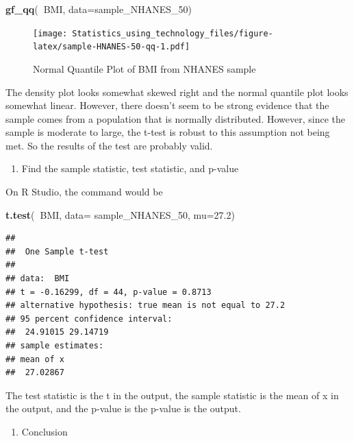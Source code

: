 \documentclass[
]{book}
\newenvironment{Shaded}{\begin{snugshade}}{\end{snugshade}}
\newcommand{\DataTypeTok}[1]{\textcolor[rgb]{0.13,0.29,0.53}{#1}}
\newcommand{\DecValTok}[1]{\textcolor[rgb]{0.00,0.00,0.81}{#1}}
\newcommand{\FloatTok}[1]{\textcolor[rgb]{0.00,0.00,0.81}{#1}}
\newcommand{\KeywordTok}[1]{\textcolor[rgb]{0.13,0.29,0.53}{\textbf{#1}}}
\newcommand{\NormalTok}[1]{#1}
\newcommand{\OperatorTok}[1]{\textcolor[rgb]{0.81,0.36,0.00}{\textbf{#1}}}
\providecommand{\tightlist}{%
  \setlength{\itemsep}{0pt}\setlength{\parskip}{0pt}}
\begin{document}
\begin{Shaded}
\begin{Highlighting}[]
\KeywordTok{gf_qq}\NormalTok{(}\OperatorTok{~}\NormalTok{BMI, }\DataTypeTok{data=}\NormalTok{sample_NHANES_}\DecValTok{50}\NormalTok{)}
\end{Highlighting}
\end{Shaded}

\begin{figure}
\centering
\texttt{[image: Statistics\_using\_technology\_files/figure-latex/sample-HNANES-50-qq-1.pdf]}
\caption{\label{fig:sample-HNANES-50-qq}Normal Quantile Plot of BMI from NHANES sample}
\end{figure}

The density plot looks somewhat skewed right and the normal quantile plot looks somewhat linear. However, there doesn't seem to be strong evidence that the sample comes from a population that is normally distributed. However, since the sample is moderate to large, the t-test is robust to this assumption not being met. So the results of the test are probably valid.

\begin{enumerate}
\def\labelenumi{\arabic{enumi}.}
\setcounter{enumi}{3}
\tightlist
\item
  Find the sample statistic, test statistic, and p-value
\end{enumerate}

On R Studio, the command would be

\begin{Shaded}
\begin{Highlighting}[]
\KeywordTok{t.test}\NormalTok{(}\OperatorTok{~}\NormalTok{BMI, }\DataTypeTok{data=}\NormalTok{ sample_NHANES_}\DecValTok{50}\NormalTok{, }\DataTypeTok{mu=}\FloatTok{27.2}\NormalTok{)}
\end{Highlighting}
\end{Shaded}

\begin{verbatim}
## 
##  One Sample t-test
## 
## data:  BMI
## t = -0.16299, df = 44, p-value = 0.8713
## alternative hypothesis: true mean is not equal to 27.2
## 95 percent confidence interval:
##  24.91015 29.14719
## sample estimates:
## mean of x 
##  27.02867
\end{verbatim}

The test statistic is the t in the output, the sample statistic is the mean of x in the output, and the p-value is the p-value is the output.

\begin{enumerate}
\def\labelenumi{\arabic{enumi}.}
\setcounter{enumi}{4}
\tightlist
\item
  Conclusion
\end{enumerate}
\end{document}
